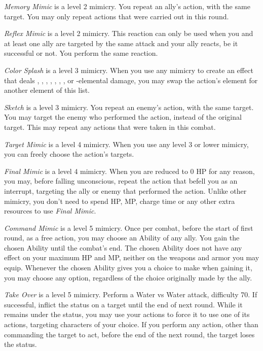\begin{multicols}{2}
    \textit{Memory Mimic} is a level 2 mimicry. You repeat an ally’s action, with the same target. You may only repeat actions that were carried out in this round.

	\textit{Reflex Mimic} is a level 2 mimicry. This reaction can only be used when you and at least one ally are targeted by the same attack and your ally reacts, be it successful or not. You perform the same reaction.
    
    \textit{Color Splash} is a level 3 mimicry. When you use any mimicry to create an effect that deals , , , , , , ,  or -elemental damage, you may swap the action’s element for another element of this list.
    
    \textit{Sketch} is a level 3 mimicry. You repeat an enemy’s action, with the same target. You may target the enemy who performed the action, instead of the original target. This may repeat any actions that were taken in this combat.
    
    \textit{Target Mimic} is a level 4 mimicry. When you use any level 3 or lower mimicry, you can freely choose the action’s targets.
	
	\textit{Final Mimic} is a level 4 mimicry. When you are reduced to 0 HP for any reason, you may, before falling unconscious, repeat the action that befell you as an interrupt, targeting the ally or enemy that performed the action.  Unlike other mimicry, you don't need to spend HP, MP, charge time or any other extra resources to use \textit{Final Mimic}.
    
    \textit{Command Mimic} is a level 5 mimicry. Once per combat, before the start of first round, as a free action, you may choose an Ability of any ally. You gain the chosen Ability until the combat’s end. The chosen Ability does not have any effect on your maximum HP and MP, neither on the weapons and armor you may equip. Whenever the chosen Ability gives you a choice to make when gaining it, you may choose any option, regardless of the choice originally made by the ally.
    
    \textit{Take Over} is a level 5 mimicry. Perform a Water vs Water attack, difficulty 70. If successful, inflict the  status on a target until the end of next round. While it remains under the  status, you may use your actions to force it to use one of its actions, targeting characters of your choice. If you perform any action, other than commanding the target to act, before the end of the next round, the target loses the  status.
\end{multicols}
\begin{center}
\end{center}
